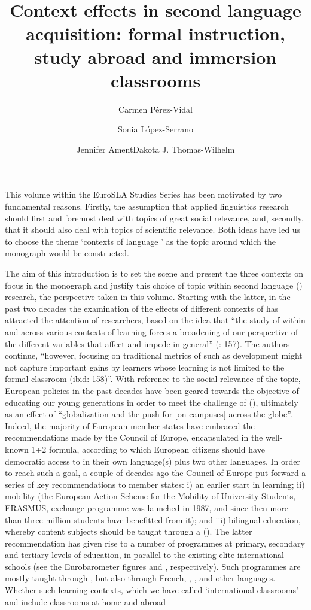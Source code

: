 \documentclass[output=paper]{langsci/langscibook}
\author{Carmen Pérez-Vidal\affiliation{Universitat Pompeu Fabra}\and  Sonia López-Serrano\affiliation{Universitat Pompeu Fabra; Universidad de Murcia}\and Jennifer Ament\affiliation{Universitat Pompeu Fabra}\lastand Dakota J. Thomas-Wilhelm\affiliation{University of Iowa; Universitat Autònoma de Barcelona}  }
\title{Context effects in second language acquisition: formal instruction, study abroad and immersion classrooms}
\begin{document}
 
 
This volume within the EuroSLA Studies Series has been motivated by two fundamental reasons. Firstly, the assumption that applied linguistics research should first and foremost deal with topics of great social relevance, and, secondly, that it should also deal with topics of scientific relevance. Both ideas have led us to choose the theme ‘contexts of language ’ as the topic around which the monograph would be constructed.

The aim of this introduction is to set the scene and present the three contexts on focus in the monograph and justify this choice of topic within second language  () research, the perspective taken in this volume. Starting with the latter, in the past two decades the examination of the effects of different contexts of  has attracted the attention of researchers, based on the idea that “the study of  within and across various contexts of learning forces a broadening of our perspective of the different variables that affect and impede  in general” (\citealt{CollentineFreed2004intro}: 157). The authors continue, “however, focusing on traditional metrics of  such as  development might not capture important gains by learners whose learning is not limited to the formal classroom (ibid: 158)”. With reference to the social relevance of the topic, European  policies in the past decades have been geared towards the objective of educating our young generations in order to meet the challenge of  (\citealt{Coleman2015,Pérez-Vidal2015a}), ultimately as an effect of “globalization and the push for  [on campuses] across the globe”\citep[1]{Jackson2013}. Indeed, the majority of European member states have embraced the recommendations made by the Council of Europe, encapsulated in the well-known 1+2 formula, according to which European citizens should have democratic access to  in their own language(s) plus two other languages. In order to reach such a goal, a couple of decades ago the Council of Europe put forward a series of key recommendations to member states: i) an earlier start in  learning; ii) mobility (the European Action Scheme for the Mobility of University Students, ERASMUS, exchange programme was launched in 1987, and since then more than three million students have benefitted from it); and iii) bilingual education, whereby content subjects should be taught through a  (\citealt{CommissionoftheEuropeanCommunities1995,CommissionoftheEuropeanCommunities1995}). The latter recommendation has given rise to a number of  programmes at primary, secondary and tertiary levels of education, in parallel to the existing elite international schools (see the Eurobarometer figures and \citealt{WächterMaiwörm2014}, respectively). Such programmes are mostly taught through , but also through French, , , and other languages. Whether such learning contexts, which we have called ‘international classrooms’ and include classrooms at home and abroad 
\end{document}

